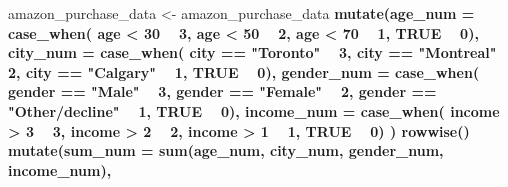 \documentclass[
]{book}
\newenvironment{Shaded}{\begin{snugshade}}{\end{snugshade}}
\newcommand{\DataTypeTok}[1]{\textcolor[rgb]{0.13,0.29,0.53}{#1}}
\newcommand{\DecValTok}[1]{\textcolor[rgb]{0.00,0.00,0.81}{#1}}
\newcommand{\KeywordTok}[1]{\textcolor[rgb]{0.13,0.29,0.53}{\textbf{#1}}}
\newcommand{\NormalTok}[1]{#1}
\newcommand{\OperatorTok}[1]{\textcolor[rgb]{0.81,0.36,0.00}{\textbf{#1}}}
\newcommand{\OtherTok}[1]{\textcolor[rgb]{0.56,0.35,0.01}{#1}}
\newcommand{\StringTok}[1]{\textcolor[rgb]{0.31,0.60,0.02}{#1}}
\begin{document}
\begin{Shaded}
\begin{Highlighting}[]
\NormalTok{amazon_purchase_data <-}
\StringTok{  }\NormalTok{amazon_purchase_data }\OperatorTok{%
\StringTok{  }\KeywordTok{mutate}\NormalTok{(}\DataTypeTok{age_num =} \KeywordTok{case_when}\NormalTok{(}
\NormalTok{           age }\OperatorTok{<}\StringTok{ }\DecValTok{30} \OperatorTok{~}\StringTok{ }\DecValTok{3}\NormalTok{,}
\NormalTok{           age }\OperatorTok{<}\StringTok{ }\DecValTok{50} \OperatorTok{~}\StringTok{ }\DecValTok{2}\NormalTok{,}
\NormalTok{           age }\OperatorTok{<}\StringTok{ }\DecValTok{70} \OperatorTok{~}\StringTok{ }\DecValTok{1}\NormalTok{,}
           \OtherTok{TRUE} \OperatorTok{~}\StringTok{ }\DecValTok{0}\NormalTok{),}
         \DataTypeTok{city_num =} \KeywordTok{case_when}\NormalTok{(}
\NormalTok{           city }\OperatorTok{==}\StringTok{ "Toronto"} \OperatorTok{~}\StringTok{ }\DecValTok{3}\NormalTok{,}
\NormalTok{           city }\OperatorTok{==}\StringTok{ "Montreal"} \OperatorTok{~}\StringTok{ }\DecValTok{2}\NormalTok{,}
\NormalTok{           city }\OperatorTok{==}\StringTok{ "Calgary"} \OperatorTok{~}\StringTok{ }\DecValTok{1}\NormalTok{,}
           \OtherTok{TRUE} \OperatorTok{~}\StringTok{ }\DecValTok{0}\NormalTok{),}
         \DataTypeTok{gender_num =} \KeywordTok{case_when}\NormalTok{(}
\NormalTok{           gender }\OperatorTok{==}\StringTok{ "Male"} \OperatorTok{~}\StringTok{ }\DecValTok{3}\NormalTok{,}
\NormalTok{           gender }\OperatorTok{==}\StringTok{ "Female"} \OperatorTok{~}\StringTok{ }\DecValTok{2}\NormalTok{,}
\NormalTok{           gender }\OperatorTok{==}\StringTok{ "Other/decline"} \OperatorTok{~}\StringTok{ }\DecValTok{1}\NormalTok{,}
           \OtherTok{TRUE} \OperatorTok{~}\StringTok{ }\DecValTok{0}\NormalTok{),}
         \DataTypeTok{income_num =} \KeywordTok{case_when}\NormalTok{(}
\NormalTok{           income }\OperatorTok{>}\StringTok{ }\DecValTok{3} \OperatorTok{~}\StringTok{ }\DecValTok{3}\NormalTok{,}
\NormalTok{           income }\OperatorTok{>}\StringTok{ }\DecValTok{2} \OperatorTok{~}\StringTok{ }\DecValTok{2}\NormalTok{,}
\NormalTok{           income }\OperatorTok{>}\StringTok{ }\DecValTok{1} \OperatorTok{~}\StringTok{ }\DecValTok{1}\NormalTok{,}
           \OtherTok{TRUE} \OperatorTok{~}\StringTok{ }\DecValTok{0}\NormalTok{)}
\NormalTok{         ) }\OperatorTok{%
\StringTok{  }\KeywordTok{rowwise}\NormalTok{() }\OperatorTok{%
\StringTok{  }\KeywordTok{mutate}\NormalTok{(}\DataTypeTok{sum_num =} \KeywordTok{sum}\NormalTok{(age_num, city_num, gender_num, income_num),}
}}}
\end{Highlighting}
\end{Shaded}
\end{document}

